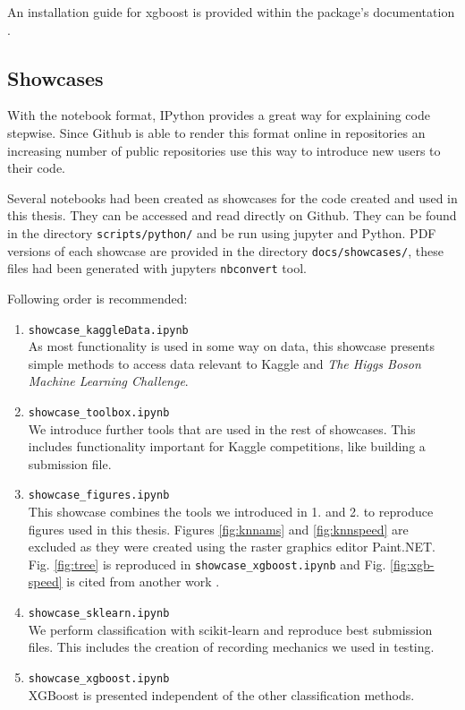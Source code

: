 An installation guide for xgboost is provided within the package's documentation \cite{xgbdoc}.

\subsection*{Showcases}
With the notebook format, IPython provides a great way for explaining code stepwise. Since Github is able to render this format online in repositories an increasing number of public repositories use this way to introduce new users to their code.

Several notebooks had been created as showcases for the code created and used in this thesis. They can be accessed and read directly on Github. They can be found in the directory \texttt{scripts/python/} and be run using jupyter and Python. PDF versions of each showcase are provided in the directory \texttt{docs/showcases/}, these files had been generated with jupyters \texttt{nbconvert} tool.

Following order is recommended:

\begin{enumerate}
	\item \texttt{showcase\_kaggleData.ipynb}\\
			As most functionality is used in some way on data, this showcase presents simple methods to access data relevant to Kaggle and \emph{The Higgs Boson Machine Learning Challenge}.
	\item \texttt{showcase\_toolbox.ipynb}\\
			We introduce further tools that are used in the rest of showcases. This includes functionality important for Kaggle competitions, like building a submission file.
	\item \texttt{showcase\_figures.ipynb}\\
			This showcase combines the tools we introduced in 1. and 2. to reproduce figures used in this thesis. Figures \ref{fig:knnams} and \ref{fig:knnspeed} are excluded as they were created using the raster graphics editor Paint.NET.\\Fig. \ref{fig:tree} is reproduced in \texttt{showcase\_xgboost.ipynb} and Fig. \ref{fig:xgb-speed} is cited from another work \cite{chen14}.
	\item \texttt{showcase\_sklearn.ipynb}\\
			We perform classification with scikit-learn and reproduce best submission files. This includes the creation of recording mechanics we used in testing.
	\item \texttt{showcase\_xgboost.ipynb}\\
			XGBoost is presented independent of the other classification methods.
\end{enumerate}

